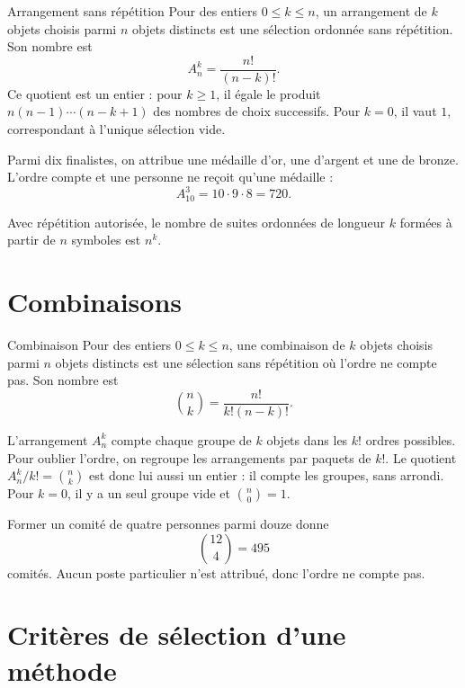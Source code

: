\begin{definition}{Arrangement sans répétition}{}
Pour des entiers $0\le k\le n$, un arrangement de $k$ objets choisis parmi $n$ objets distincts est une sélection ordonnée sans répétition. Son nombre est
\[
A_n^k=\frac{n!}{(n-k)!}.
\]
Ce quotient est un entier : pour $k\ge1$, il égale le produit $n(n-1)\cdots(n-k+1)$ des nombres de choix successifs. Pour $k=0$, il vaut $1$, correspondant à l'unique sélection vide.
\end{definition}

\begin{examplebox}
Parmi dix finalistes, on attribue une médaille d'or, une d'argent et une de bronze. L'ordre compte et une personne ne reçoit qu'une médaille :
\[
A_{10}^3=10\cdot9\cdot8=720.
\]
\end{examplebox}

Avec répétition autorisée, le nombre de suites ordonnées de longueur $k$ formées à partir de $n$ symboles est $n^k$.

\section{Combinaisons}
\label{manual:section:07.04}

\begin{definition}{Combinaison}{}
Pour des entiers $0\le k\le n$, une combinaison de $k$ objets choisis parmi $n$ objets distincts est une sélection sans répétition où l'ordre ne compte pas. Son nombre est
\[
\binom nk=\frac{n!}{k!(n-k)!}.
\]
\end{definition}

\begin{intuitionbox}
L'arrangement $A_n^k$ compte chaque groupe de $k$ objets dans les $k!$ ordres possibles. Pour oublier l'ordre, on regroupe les arrangements par paquets de $k!$. Le quotient $A_n^k/k!=\binom nk$ est donc lui aussi un entier : il compte les groupes, sans arrondi. Pour $k=0$, il y a un seul groupe vide et $\binom n0=1$.
\end{intuitionbox}

\begin{examplebox}
Former un comité de quatre personnes parmi douze donne
\[
\binom{12}{4}=495
\]
comités. Aucun poste particulier n'est attribué, donc l'ordre ne compte pas.
\end{examplebox}

\section{Critères de sélection d'une méthode}
\label{manual:section:07.05}

